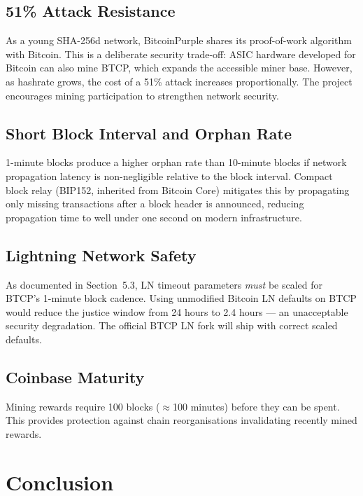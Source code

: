 \documentclass[12pt, a4paper]{article}
\begin{document}
\subsection{51\% Attack Resistance}

As a young SHA-256d network, BitcoinPurple shares its proof-of-work algorithm
with Bitcoin.  This is a deliberate security trade-off: ASIC hardware developed
for Bitcoin can also mine BTCP, which expands the accessible miner base.
However, as hashrate grows, the cost of a 51\% attack increases proportionally.
The project encourages mining participation to strengthen network security.

\subsection{Short Block Interval and Orphan Rate}

1-minute blocks produce a higher orphan rate than 10-minute blocks if network
propagation latency is non-negligible relative to the block interval.  Compact
block relay (BIP152, inherited from Bitcoin Core) mitigates this by propagating
only missing transactions after a block header is announced, reducing propagation
time to well under one second on modern infrastructure.

\subsection{Lightning Network Safety}

As documented in Section~5.3, LN timeout parameters \emph{must} be scaled for
BTCP's 1-minute block cadence.  Using unmodified Bitcoin LN defaults on BTCP
would reduce the justice window from 24 hours to 2.4 hours — an unacceptable
security degradation.  The official BTCP LN fork will ship with correct scaled
defaults.

\subsection{Coinbase Maturity}

Mining rewards require 100 blocks (\(\approx\)100 minutes) before they can be
spent.  This provides protection against chain reorganisations invalidating
recently mined rewards.

\newpage
\section{Conclusion}
\end{document}
